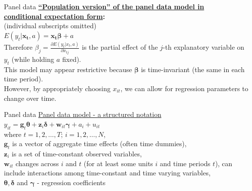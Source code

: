 \documentclass[usenames,dvipsnames]{beamer}
\begin{document}
\begin{frame}{Panel data}
\textbf{\underline{``Population version'' of the panel data model in}} \\
\textbf{\underline{conditional expectation form}:}\\
\medskip
(individual subscripts omitted) \\
\medskip
$E(y_t | \bm{x_t}, a) = \bm{x_t \beta}+a$ \\
\medskip
Therefore $\beta_j = \frac{\partial E (y_t | x_t, a)}{\partial x_{tj}}$ is the partial effect of the $j$-th explanatory variable on $y_t$ (while holding $a$ fixed). \\
\medskip
This model may appear restrictive because $\bm{\beta}$ is time-invariant (the same in each time period). \\
\medskip
However, by appropriately choosing $x_{it}$, we can allow for regression parameters to change over time. 
\end{frame}
\begin{frame}{Panel data}
\underline{Panel data model - a structured notation } \\
\medskip
$y_{it} = \bm{g}_t \bm{\theta} + \bm{z}_i \bm{\delta} + \bm{w}_{it} \bm{\gamma} + a_i + u_{it}$ \\
\medskip
where $t = 1, 2, \dots, T$; \quad $i = 1,2, \dots, N$,  \\
\medskip
$\bm{g}_t$ is a vector of aggregate time effects (often time dummies),\\
\medskip
$\bm{z}_i$ is a set of time-constant observed variables, \\
\medskip
$\bm{w}_{it}$ changes across $i$ and $t$ (for at least some units $i$ and time periods $t$), can include interactions among time-constant and time varying variables, \\
\medskip
$\bm{\theta, \delta}$ and $\bm{\gamma}$ - regression coefficients 
\end{frame}
\end{document}
